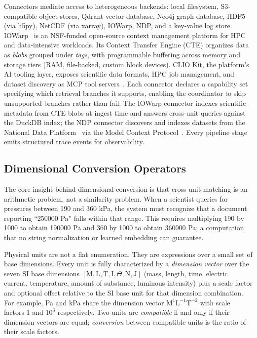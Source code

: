 Connectors mediate access to heterogeneous backends: local filesystem, S3-compatible object stores, Qdrant vector database, Neo4j graph database, HDF5 (via h5py), NetCDF (via xarray), IOWarp, NDP, and a key-value log store. IOWarp~\cite{iowarp2024} is an NSF-funded open-source context management platform for HPC and data-intensive workloads. Its Context Transfer Engine (CTE) organizes data as \emph{blobs} grouped under \emph{tags}, with programmable buffering across memory and storage tiers (RAM, file-backed, custom block devices). CLIO Kit, the platform's AI tooling layer, exposes scientific data formats, HPC job management, and dataset discovery as MCP tool servers~\cite{islam2025aidriven}. Each connector declares a capability set specifying which retrieval branches it supports, enabling the coordinator to skip unsupported branches rather than fail. The IOWarp connector indexes scientific metadata from CTE blobs at ingest time and answers cross-unit queries against the DuckDB index; the NDP connector discovers and indexes datasets from the National Data Platform~\cite{ndp2024} via the Model Context Protocol~\cite{mcp2024}. Every pipeline stage emits structured trace events for observability.

\subsection{Dimensional Conversion Operators}

The core insight behind dimensional conversion is that cross-unit matching is an arithmetic problem, not a similarity problem. When a scientist queries for pressures between 190 and 360 kPa, the system must recognize that a document reporting ``250000 Pa'' falls within that range. This requires multiplying 190 by 1000 to obtain 190000 Pa and 360 by 1000 to obtain 360000 Pa; a computation that no string normalization or learned embedding can guarantee.

Physical units are not a flat enumeration. They are expressions over a small set of base dimensions. Every unit is fully characterized by a \emph{dimension vector} over the seven SI base dimensions $[\text{M}, \text{L}, \text{T}, \text{I}, \Theta, \text{N}, \text{J}]$ (mass, length, time, electric current, temperature, amount of substance, luminous intensity) plus a scale factor and optional offset relative to the SI base unit for that dimension combination. For example, Pa and kPa share the dimension vector $\text{M}^1\text{L}^{-1}\text{T}^{-2}$ with scale factors 1 and $10^3$ respectively. Two units are \emph{compatible} if and only if their dimension vectors are equal; \emph{conversion} between compatible units is the ratio of their scale factors.

